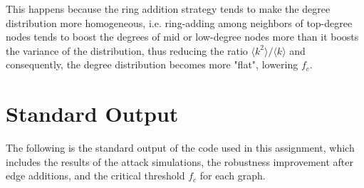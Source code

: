 \documentclass{article}
\begin{document}
This happens because the ring addition strategy tends to make the degree distribution more homogeneous, i.e. ring-adding among neighbors of top-degree nodes tends to boost the degrees of mid or low-degree nodes more than it boosts the variance of the distribution, thus reducing the ratio $\langle k^2\rangle/\langle k\rangle$ and consequently, the degree distribution becomes more "flat", lowering $f_c$.


\section{Standard Output}
The following is the standard output of the code used in this assignment, which includes the results of the attack simulations, the robustness improvement after edge additions, and the critical threshold $f_c$ for each graph.

\end{document}

